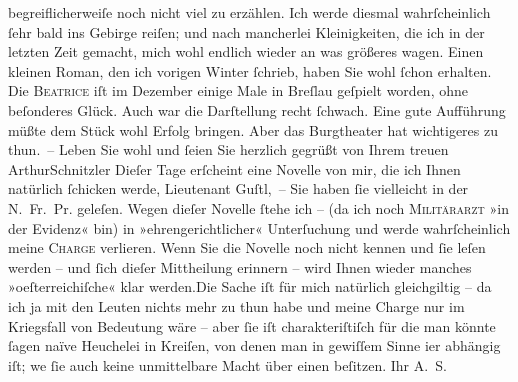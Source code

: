 \begin{ledgroupsized}[t]{13cm}
               begreiflicherweiſe noch nicht viel zu erzählen. Ich werde diesmal wahrſcheinlich ſehr
               bald ins Gebirge reiſen; und nach mancherlei Kleinigkeiten, die ich in der letzten
               Zeit gemacht, mich wohl endlich wieder \introOben{}an\introOben{} was größeres {\pb}wagen. Einen kleinen Roman, den ich vorigen Winter{ }ſchrieb, haben Sie wohl ſchon erhalten. Die \textsc{Beatrice} iſt im Dezember einige Male in Breſlau geſpielt worden, ohne beſonderes Glück. Auch war die Darſtellung
               recht ſchwach. Eine gute Aufführung müßte dem Stück wohl Erfolg bringen. Aber das Burgtheater hat wichtigeres zu thun. –\pend
           \pstart Leben Sie wohl und ſeien Sie herzlich gegrüßt von Ihrem treuen
                  \spacefill\mbox{ArthurSchnitzler}\pend{}\pstart
           \noindent{}{\pb}Dieſer Tage erſcheint eine Novelle von mir,
                  die ich Ihnen natürlich ſchicken werde, Lieutenant
                     Guſtl, – Sie haben ſie vielleicht in der N. Fr. Pr. geleſen. Wegen dieſer Novelle ſtehe ich – (da ich noch \textsc{Militärarzt} »in der Evidenz« bin) in »ehrengerichtlicher«
                  Unterſuchung und werde wahrſcheinlich meine \textsc{Charge}
                  verlieren. Wenn Sie die Novelle {\pb}noch nicht
                  kennen und ſie leſen werden – und ſich dieſer Mittheilung erinnern – wird Ihnen
                  wieder manches »oeſterreichiſche« klar
                     werden.\hspace*{1.5em}Die Sache iſt für mich natürlich
                  gleichgiltig – da ich ja mit den Leuten nichts mehr zu thun habe und meine Charge
                  nur im Kriegsfall von Bedeutung wäre – aber ſie iſt charakteriſtiſch für {\pb}die man könnte ſagen naïve Heuchelei in
                  Kreiſen, von denen man in gewiſſem Sinne i{\geminationm}er
                  abhängig iſt; we{\geminationn}{ }ſie auch keine unmittelbare Macht über einen
                  beſitzen.\pend
           \pstart
           Ihr \spacefill\mbox{A. S.}\pend
           
         
         \endnumbering{}\end{ledgroupsized}  \newcommand{\dateiname}{L01114}\newcommand{\titel}{Arthur Schnitzler an Georg Brandes, 25. 4. 1901}\newcommand{\editorInnen}{Martin Anton Müller und Gerd-Hermann Susen}
      
